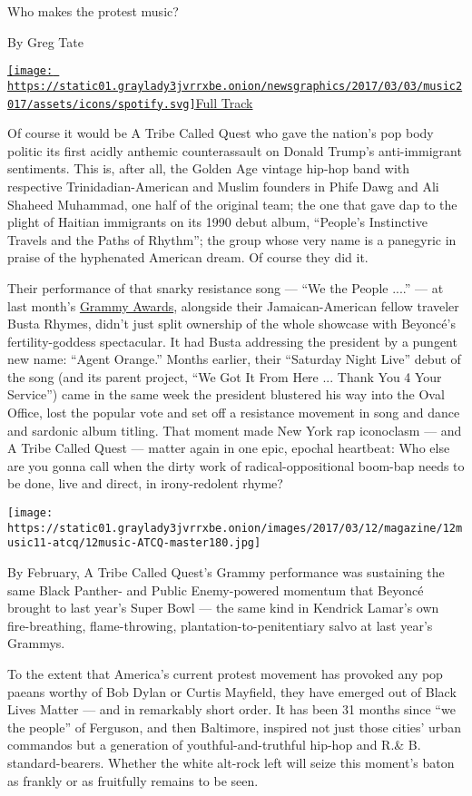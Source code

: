 Who makes the protest music?

By Greg Tate

\href{https://open.spotify.com/track/3wUX7HpXS382s1DHTRouVk}{\texttt{[image: https://static01.graylady3jvrrxbe.onion/newsgraphics/2017/03/03/music2017/assets/icons/spotify.svg]}Full
Track}

Of course it would be A Tribe Called Quest who gave the nation's pop
body politic its first acidly anthemic counterassault on Donald Trump's
anti-immigrant sentiments. This is, after all, the Golden Age vintage
hip-hop band with respective Trinidadian-American and Muslim founders in
Phife Dawg and Ali Shaheed Muhammad, one half of the original team; the
one that gave dap to the plight of Haitian immigrants on its 1990 debut
album, ``People's Instinctive Travels and the Paths of Rhythm''; the
group whose very name is a panegyric in praise of the hyphenated
American dream. Of course they did it.

Their performance of that snarky resistance song --- ``We the People
....'' --- at last month's
\href{https://www.grammy.com/videos/a-tribe-called-quest-anderson-paak-grammy-performance-medley}{Grammy
Awards}, alongside their Jamaican-American fellow traveler Busta Rhymes,
didn't just split ownership of the whole showcase with Beyoncé's
fertility-goddess spectacular. It had Busta addressing the president by
a pungent new name: ``Agent Orange.'' Months earlier, their ``Saturday
Night Live'' debut of the song (and its parent project, ``We Got It From
Here ... Thank You 4 Your Service'') came in the same week the president
blustered his way into the Oval Office, lost the popular vote and set
off a resistance movement in song and dance and sardonic album titling.
That moment made New York rap iconoclasm --- and A Tribe Called Quest
--- matter again in one epic, epochal heartbeat: Who else are you gonna
call when the dirty work of radical-oppositional boom-bap needs to be
done, live and direct, in irony-redolent rhyme?

\texttt{[image: https://static01.graylady3jvrrxbe.onion/images/2017/03/12/magazine/12music11-atcq/12music-ATCQ-master180.jpg]}

By February, A Tribe Called Quest's Grammy performance was sustaining
the same Black Panther- and Public Enemy-powered momentum that Beyoncé
brought to last year's Super Bowl --- the same kind in Kendrick Lamar's
own fire-breathing, flame-throwing, plantation-to-penitentiary salvo at
last year's Grammys.

To the extent that America's current protest movement has provoked any
pop paeans worthy of Bob Dylan or Curtis Mayfield, they have emerged out
of Black Lives Matter --- and in remarkably short order. It has been 31
months since ``we the people'' of Ferguson, and then Baltimore, inspired
not just those cities' urban commandos but a generation of
youthful-and-truthful hip-hop and R.\& B. standard-bearers. Whether the
white alt-rock left will seize this moment's baton as frankly or as
fruitfully remains to be seen.

